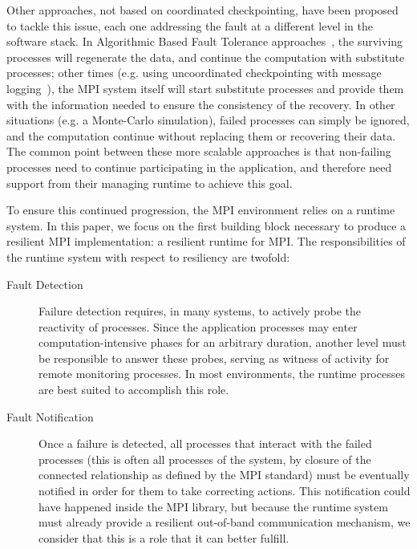 \documentclass{llncs}
\begin{document}
Other approaches, not based on coordinated checkpointing, have been
proposed to tackle this issue, each one addressing the fault at a
different level in the software stack. In Algorithmic Based Fault
Tolerance approaches~\cite{494110}, the surviving processes will
regenerate the data, and continue the computation with substitute
processes; other times (e.g. using uncoordinated checkpointing with
message logging~\cite{mpichv2}), the MPI system itself will start
substitute processes and provide them with the information needed to
ensure the consistency of the recovery. In other situations (e.g. a
Monte-Carlo simulation), failed processes can simply be ignored, and
the computation continue without replacing them or recovering their
data.
The common point between these more scalable approaches is that
non-failing processes need to continue participating in the
application, and therefore need support from their managing runtime to
achieve this goal.

To ensure this continued progression, the MPI environment relies on a
runtime system. In this paper, we focus on the first building block
necessary to produce a resilient MPI implementation: a resilient
runtime for MPI. The responsibilities of the runtime system with
respect to resiliency are twofold:

\begin{description}

\item[Fault Detection] Failure detection requires, in many systems, to
  actively probe the reactivity of processes. Since the application
  processes may enter com\-pu\-ta\-tion-intensive phases for an arbitrary
  duration, another level must be responsible to answer these probes,
  serving as witness of activity for remote monitoring processes. In
  most environments, the runtime processes are best suited to
  accomplish this role.

\item[Fault Notification] Once a failure is detected, all processes
  that interact with the failed processes (this is often all processes
  of the system, by closure of the connected relationship as defined
  by the MPI standard) must be eventually notified in order for them
  to take correcting actions. This notification could have happened
  inside the MPI library, but because the runtime system must already
  provide a resilient out-of-band communication mechanism, we consider
  that this is a role that it can better fulfill.

\end{description}
\end{document}
